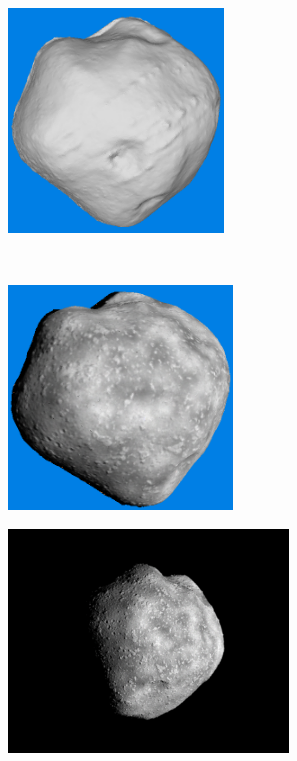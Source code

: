 \begin{figure}[htbp]
\begin{subfigure}[b]{0.4\textwidth}
        \caption{}
        \label{fig:recon_step_mesh}
    \end{subfigure}
    \begin{subfigure}[b]{0.4\textwidth}
        \centering
        \includegraphics[width=\textwidth,height=5.95cm]{doc/thesis/0_figures/models_quality/100_1/120_100_1_refine2.png}
        \caption{}
        \label{fig:recon_step_refine}
    \end{subfigure}
    \\
    \begin{subfigure}[b]{0.4\textwidth}
        \centering
        \includegraphics[width=\textwidth,height=5.95cm]{doc/thesis/0_figures/models_quality/100_1/120_100_1_texture1.png}
        \caption{}
        \label{fig:recon_step_texture}
    \end{subfigure}
    \begin{subfigure}[b]{0.4\textwidth}
        \centering
        \includegraphics[width=\textwidth,height=5.95cm]{doc/thesis/0_figures/models_quality/100_1/120_100_1_img1.png}

\end{subfigure}
\end{figure}
